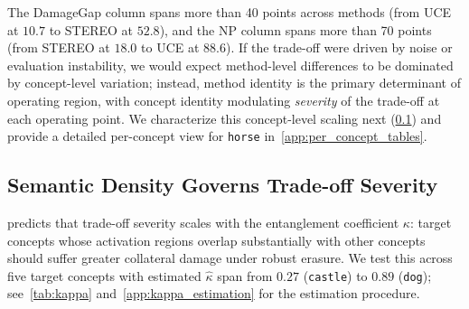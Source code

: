 The DamageGap column spans more than 40 points across methods (from UCE at $10.7$ to STEREO at $52.8$), and the NP column spans more than 70 points (from STEREO at $18.0$ to UCE at $88.6$). If the trade-off were driven by noise or evaluation instability, we would expect method-level differences to be dominated by concept-level variation; instead, method identity is the primary determinant of operating region, with concept identity modulating \emph{severity} of the trade-off at each operating point. We characterize this concept-level scaling next (\cref{subsec:kappa_scaling}) and provide a detailed per-concept view for \texttt{horse} in~\cref{app:per_concept_tables}.


\subsection{Semantic Density Governs Trade-off Severity}
\label{subsec:kappa_scaling}
 predicts that trade-off severity scales with the entanglement coefficient $\kappa$: target concepts whose activation regions overlap substantially with other concepts should suffer greater collateral damage under robust erasure. We test this across five target concepts with estimated $\hat\kappa$ span from $0.27$ (\texttt{castle}) to $0.89$ (\texttt{dog}); see~\cref{tab:kappa} and~\cref{app:kappa_estimation} for the estimation procedure. 


